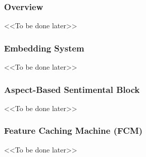 \subsubsection{Overview}
<<To be done later>>

\subsubsection{Embedding System}
<<To be done later>>

\subsubsection{Aspect-Based Sentimental Block}
<<To be done later>>

\subsubsection{Feature Caching Machine (FCM)}
<<To be done later>>